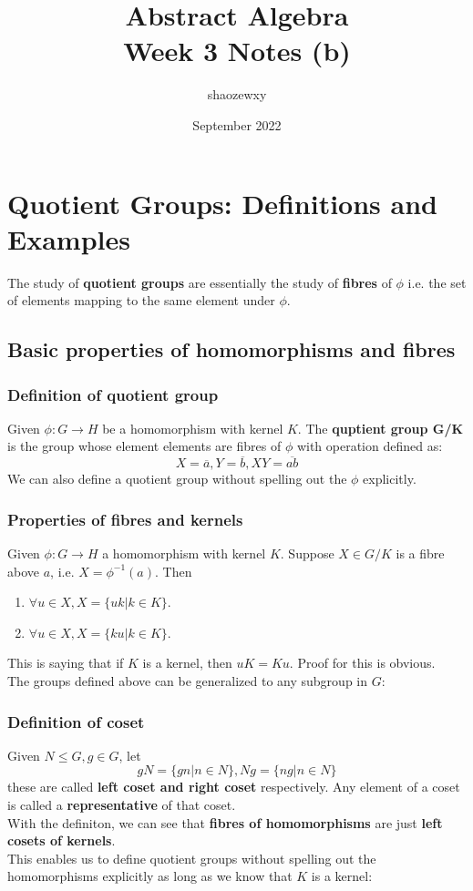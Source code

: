 \documentclass{article}
\title{Abstract Algebra\\
\large{Week 3 Notes (b)}}
\author{shaozewxy }
\date{September 2022}
\begin{document}
\maketitle
\section*{Quotient Groups: Definitions and Examples}
The study of \textbf{quotient groups} are essentially the study of \textbf{fibres} of $\phi$ i.e. the set of elements mapping to the same element under $\phi$.
\subsection*{Basic properties of homomorphisms and fibres}
\subsubsection*{Definition of quotient group}
Given $\phi: G \rightarrow H$ be a homomorphism with kernel $K$. The \textbf{quptient group G/K}  is the group whose element elements are fibres of $\phi$ with operation defined as:
\begin{equation*}
    X = \overline{a}, Y = \overline{b}, XY = \overline{ab}
\end{equation*}
We can also define a quotient group without spelling out the $\phi$ explicitly.
\subsubsection*{Properties of fibres and kernels}
Given $\phi: G \rightarrow H$ a homomorphism with kernel $K$. Suppose $X \in G/K$ is a fibre above $a$, i.e. $X = \phi^{-1}(a)$. Then
\begin{enumerate}
    \item $\forall u \in X, X = \{uk| k \in K\}$.
    \item $\forall u \in X, X = \{ku| k \in K\}$.
\end{enumerate}
This is saying that if $K$ is a kernel, then $uK = Ku$.
Proof for this is obvious.\\
The groups defined above can be generalized to any subgroup in $G$:
\subsubsection*{Definition of coset}
Given $N \leq G, g \in G$, let
\begin{equation*}
    gN = \{gn | n \in N\}, Ng = \{ng | n \in N\}
\end{equation*}
these are called \textbf{left coset and right coset} respectively. Any element of a coset is called a \textbf{representative} of that coset.\\
With the definiton, we can see that \textbf{fibres of homomorphisms} are just \textbf{left cosets of kernels}.\\
This enables us to define quotient groups without spelling out the homomorphisms explicitly as long as we know that $K$ is a kernel:
\end{document}
